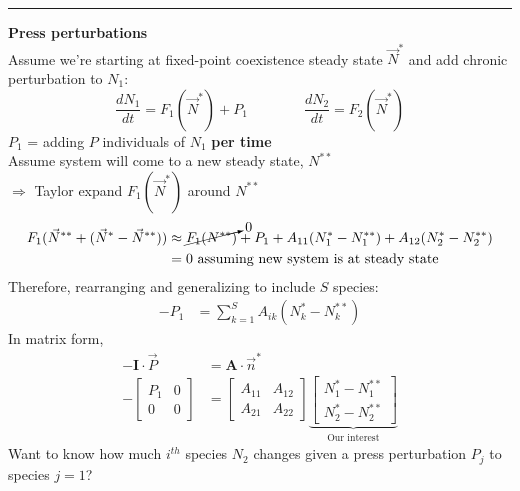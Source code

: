 \documentclass{article}
\newcommand{\ind}{\-\hspace{1cm}}
\begin{document}
\rule[0.5ex]{\linewidth}{1pt}

\textbf{Press perturbations}\\
Assume we're starting at fixed-point coexistence steady state $\vec{N}^*$ and add chronic perturbation to $N_1$:
\begin{equation*}
	\frac{dN_1}{dt}=F_1(\vec{N}^*)+P_1 \qquad \qquad  \frac{dN_2}{dt}=F_2(\vec{N}^*)
\end{equation*}
\ind $P_1$ = adding $P$ individuals of $N_1$ \textbf{per time}\\

Assume system will come to a new steady state, $N^{**}$\\

$\Rightarrow$ Taylor expand $F_1(\vec{N}^*)$ around $N^{**}$
\begin{align*}
	F_1(\vec{N}^{**}+(\vec{N}^*-\vec{N}^{**})) & \approx \cancelto{0}{F_1(N^{**})} +  P_1 + A_{11}(N_1^*-N_1^{**}) + A_{12}(N_2^*-N_2^{**})\\
	& = 0 \text{ assuming new system is at steady state}
\end{align*}
Therefore, rearranging and generalizing to include $S$ species:
\begin{align*}
	-P_1 &= \sum_{k=1}^S A_{ik}(N_k^*-N_k^{**})
\end{align*}
In matrix form,
\begin{align*}
	-\mathbf{I}\cdot \vec{P}&= \mathbf{A} \cdot \vec{n}^*\\
	-\begin{bmatrix} P_1 & 0\\0 & 0 \end{bmatrix}&=\begin{bmatrix} A_{11} & A_{12}\\A_{21} & A_{22} \end{bmatrix} \underbrace{\begin{bmatrix} N_1^* - N_1^{**} \\ N_2^* - N_2^{**}	\end{bmatrix}}_{\text{Our interest}}
\end{align*}
Want to know how much $i^{th}$ species $N_2$ changes given a press perturbation $P_j$ to species $j=1$?
\end{document}
